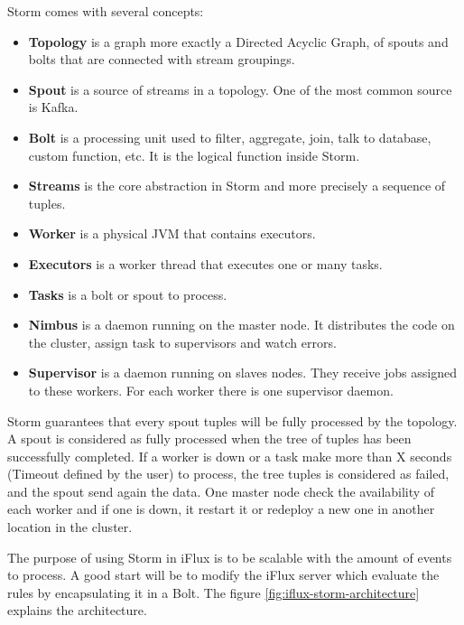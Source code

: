 Storm comes with several concepts:
\begin{itemize}
\item\textbf{Topology} is a graph more exactly a Directed Acyclic Graph, of spouts and bolts that are connected with stream groupings. 
\item\textbf{Spout} is a source of streams in a topology. One of the most common source is Kafka. 
\item\textbf{Bolt} is a processing unit used to filter, aggregate, join, talk to database, custom function, etc. It is the logical function inside Storm. 
\item\textbf{Streams} is the core abstraction in Storm and more precisely a sequence of tuples. 
\item\textbf{Worker} is a physical JVM that contains executors. 
\item\textbf{Executors} is a worker thread that executes one or many tasks.
\item\textbf{Tasks} is a bolt or spout to process.
\item\textbf{Nimbus} is a daemon running on the master node. It distributes the code on the cluster, assign task to supervisors and watch errors. 
\item\textbf{Supervisor} is a daemon running on slaves nodes. They receive jobs assigned to these workers. For each worker there is one supervisor daemon. 
\end{itemize}


Storm guarantees that every spout tuples will be fully processed by the topology. A spout is considered as fully processed when the tree of tuples has been successfully completed. If a worker is down or a task make more than X seconds (Timeout defined by the user) to process, the tree tuples is considered as failed, and the spout send again the data. One master node check the availability of each worker and if one is down, it restart it or redeploy a new one in another location in the cluster. 

The purpose of using Storm in iFlux is to be scalable with the amount of events to process. A good start will be to modify the iFlux server which evaluate the rules by encapsulating it in a Bolt. The figure \ref{fig:iflux-storm-architecture} explains the architecture. 

